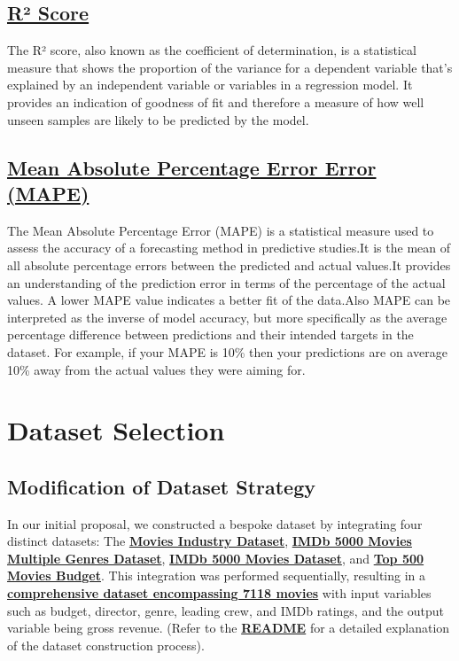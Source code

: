 \documentclass[conference]{IEEEtran}
\begin{document}
    \subsection*{\href{https://en.wikipedia.org/wiki/Coefficient_of_determination}{R² Score}}
        The R² score, also known as the coefficient of determination, is a statistical measure that shows the proportion of the variance for a dependent variable that's explained by an independent variable or variables in a regression model. It provides an indication of goodness of fit and therefore a measure of how well unseen samples are likely to be predicted by the model.
    
    \subsection*{\href{https://stephenallwright.com/interpret-mape/}{Mean Absolute Percentage Error Error (MAPE)}}
        The Mean Absolute Percentage Error (MAPE) is a statistical measure used to assess the accuracy of a forecasting method in predictive studies.It is the mean of all absolute percentage errors between the predicted and actual values.It provides an understanding of the prediction error in terms of the percentage of the actual values. A lower MAPE value indicates a better fit of the data.Also MAPE can be interpreted as the inverse of model accuracy, but more specifically as the average percentage difference between predictions and their intended targets in the dataset. For example, if your MAPE is 10\% then your predictions are on average 10\% away from the actual values they were aiming for.

\section{Dataset Selection}
     \subsection{Modification of Dataset Strategy}
        In our initial proposal, we constructed a bespoke dataset by integrating four distinct datasets: The \href{https://www.kaggle.com/datasets/danielgrijalvas/movies}{\textbf{Movies Industry Dataset}}, \href{https://www.kaggle.com/datasets/rakkesharv/imdb-5000-movies-multiple-genres-dataset}{\textbf{IMDb 5000 Movies Multiple Genres Dataset}}, \href{https://www.kaggle.com/datasets/carolzhangdc/imdb-5000-movie-dataset}{\textbf{IMDb 5000 Movies Dataset}}, and \href{https://www.kaggle.com/datasets/mitchellharrison/top-500-movies-budget}{\textbf{Top 500 Movies Budget}}. This integration was performed sequentially, resulting in a \href{https://github.com/Vikranth3140/Movie-Revenue-Prediction/blob/main/old%20datasets/final_dataset.csv}{\textbf{comprehensive dataset encompassing 7118 movies}} with input variables such as budget, director, genre, leading crew, and IMDb ratings, and the output variable being gross revenue. (Refer to the \href{https://github.com/Vikranth3140/Movie-Revenue-Prediction/blob/main/old%20datasets/README.md}{\textbf{README}} for a detailed explanation of the dataset construction process).
        
\end{document}
